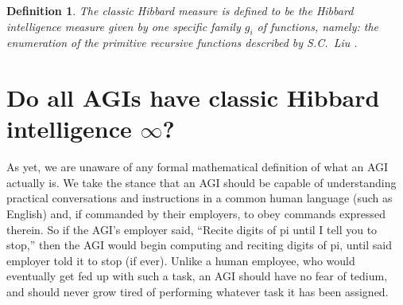 \documentclass{article}
\newtheorem{definition}{Definition}
\begin{document}
\begin{definition}
\label{classichibbardmeasuredefn}
    The \emph{classic Hibbard measure} is defined to be the Hibbard intelligence
    measure given by one specific family $g_i$ of functions, namely:
    the enumeration of the primitive recursive functions described by S.C.\ Liu
    \cite{liu1960enumeration}.
\end{definition}


\section{Do all AGIs have classic Hibbard intelligence $\infty$?}
\label{agiperspectivesection}

As yet, we are unaware of any formal mathematical definition of what an AGI
actually is. We take the stance that an AGI should be capable of understanding
practical conversations and instructions in a common human language (such as
English) and, if commanded by their employers, to obey commands expressed
therein. So if the AGI's employer said, ``Recite digits of pi until I tell you to
stop,'' then the AGI would begin computing and reciting digits of pi, until said
employer told it to stop (if ever). Unlike a human employee, who would eventually
get fed up with such a task, an AGI should have no fear of tedium, and should
never grow tired of performing whatever task it has been assigned.
\end{document}
